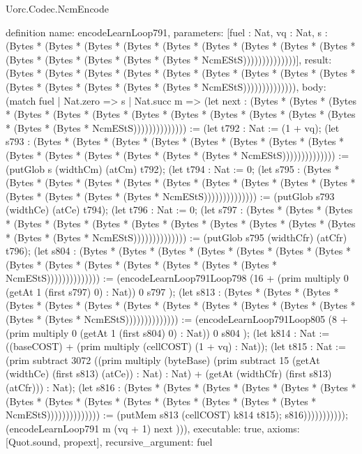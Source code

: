 \begin{lexlean}{Uorc.Codec.NcmEncode}
\begin{semanticmodule}
definition{
  name: encodeLearnLoop791,
  parameters: [fuel : Nat, vq : Nat, s : (Bytes * (Bytes * (Bytes * (Bytes * (Bytes * (Bytes * (Bytes * (Bytes * (Bytes * (Bytes * (Bytes * (Bytes * (Bytes * (Bytes * NcmEStS))))))))))))))],
  result: (Bytes * (Bytes * (Bytes * (Bytes * (Bytes * (Bytes * (Bytes * (Bytes * (Bytes * (Bytes * (Bytes * (Bytes * (Bytes * (Bytes * NcmEStS)))))))))))))),
  body: (match fuel
    | Nat.zero => s
    | Nat.succ m => (let next : (Bytes * (Bytes * (Bytes * (Bytes * (Bytes * (Bytes * (Bytes * (Bytes * (Bytes * (Bytes * (Bytes * (Bytes * (Bytes * (Bytes * NcmEStS)))))))))))))) := (let t792 : Nat := (1 + vq); (let s793 : (Bytes * (Bytes * (Bytes * (Bytes * (Bytes * (Bytes * (Bytes * (Bytes * (Bytes * (Bytes * (Bytes * (Bytes * (Bytes * (Bytes * NcmEStS)))))))))))))) := (putGlob s (widthCm) (atCm) t792); (let t794 : Nat := 0; (let s795 : (Bytes * (Bytes * (Bytes * (Bytes * (Bytes * (Bytes * (Bytes * (Bytes * (Bytes * (Bytes * (Bytes * (Bytes * (Bytes * (Bytes * NcmEStS)))))))))))))) := (putGlob s793 (widthCe) (atCe) t794); (let t796 : Nat := 0; (let s797 : (Bytes * (Bytes * (Bytes * (Bytes * (Bytes * (Bytes * (Bytes * (Bytes * (Bytes * (Bytes * (Bytes * (Bytes * (Bytes * (Bytes * NcmEStS)))))))))))))) := (putGlob s795 (widthCfr) (atCfr) t796); (let s804 : (Bytes * (Bytes * (Bytes * (Bytes * (Bytes * (Bytes * (Bytes * (Bytes * (Bytes * (Bytes * (Bytes * (Bytes * (Bytes * (Bytes * NcmEStS)))))))))))))) := (encodeLearnLoop791Loop798 (16 + (prim multiply 0 (getAt 1 (first s797) 0) : Nat)) 0 s797 ); (let s813 : (Bytes * (Bytes * (Bytes * (Bytes * (Bytes * (Bytes * (Bytes * (Bytes * (Bytes * (Bytes * (Bytes * (Bytes * (Bytes * (Bytes * NcmEStS)))))))))))))) := (encodeLearnLoop791Loop805 (8 + (prim multiply 0 (getAt 1 (first s804) 0) : Nat)) 0 s804 ); (let k814 : Nat := ((baseCOST) + (prim multiply (cellCOST) (1 + vq) : Nat)); (let t815 : Nat := (prim subtract 3072 ((prim multiply (byteBase) (prim subtract 15 (getAt (widthCe) (first s813) (atCe)) : Nat) : Nat) + (getAt (widthCfr) (first s813) (atCfr))) : Nat); (let s816 : (Bytes * (Bytes * (Bytes * (Bytes * (Bytes * (Bytes * (Bytes * (Bytes * (Bytes * (Bytes * (Bytes * (Bytes * (Bytes * (Bytes * NcmEStS)))))))))))))) := (putMem s813 (cellCOST) k814 t815); s816))))))))))); (encodeLearnLoop791 m (vq + 1) next ))),
  executable: true,
  axioms: [Quot.sound, propext],
  recursive_argument: fuel
}


\end{semanticmodule}
\end{lexlean}
